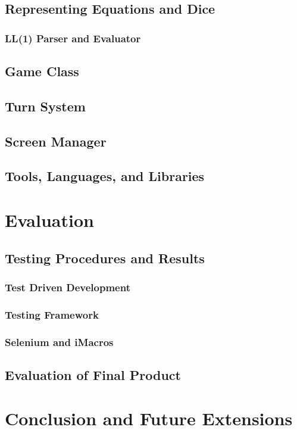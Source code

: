 \documentclass[12pt]{article} %
\begin{document}
\subsection{Representing Equations and Dice}
\subsubsection{LL(1) Parser and Evaluator}
\subsection{Game Class}
\subsection{Turn System}
\subsection{Screen Manager}
\subsection{Tools, Languages, and Libraries}

\section{Evaluation}
\subsection{Testing Procedures and Results}
\subsubsection{Test Driven Development}
\subsubsection{Testing Framework}
\subsubsection{Selenium and iMacros}
\subsection{Evaluation of Final Product}

\section{Conclusion and Future Extensions}
\end{document}
